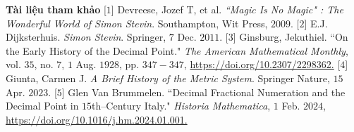 \begin{multicols}{2}
\begin{figure}[H]
		\vspace*{-10pt}
	\end{figure}
	\vskip 0.2cm
	\vskip 0.2cm
	\textbf{\color{toanhocdoisong}Tài liệu tham khảo}
	\vskip 0.1cm
	[$1$] Devreese, Jozef T, et al. \textit{``Magic Is No Magic" : The Wonderful World of Simon Stevin}. Southampton, Wit Press, $2009$.
	\vskip 0.1cm
	[$2$] E.J. Dijksterhuis. \textit{Simon Stevin}. Springer, $7$ Dec. $2011$.
	\vskip 0.1cm
	[$3$] Ginsburg, Jekuthiel. ``On the Early History of the Decimal Point." \textit{The American Mathematical Monthly}, vol. $35$, no. $7$, $1$ Aug. $1928$, pp. $347-347$, \url{https://doi.org/10.2307/2298362.}
	\vskip 0.1cm
	[$4$] Giunta, Carmen J. \textit{A Brief History of the Metric System}. Springer Nature, $15$ Apr. $2023$.
	\vskip 0.1cm
	[$5$] Glen Van Brummelen. ``Decimal Fractional Numeration and the Decimal Point in $15$th--Century Italy." \textit{Historia Mathematica}, $1$ Feb. $2024$, \url{https://doi.org/10.1016/j.hm.2024.01.001.}
\end{multicols}